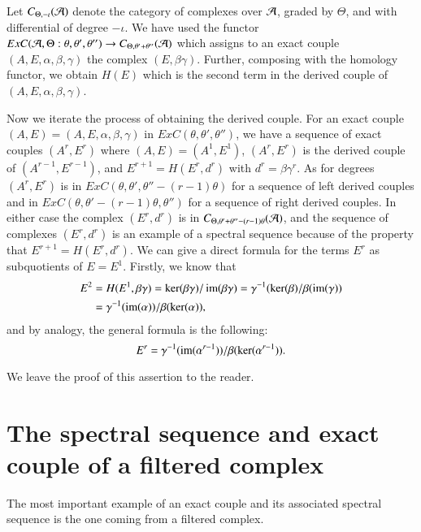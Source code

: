 \begin{remark}\label{chap1-rem4.3}
Let $C_{\Theta,-\iota}(\mathcal{A})$ denote the category of complexes over
$\mathcal{A}$, graded by $\Theta$, and with differential of degree $-\iota$. We
have used the functor $ExC(\mathcal{A},\Theta:\theta,\theta',\theta'')\to
C_{\Theta,\theta'+\theta''}(\mathcal{A})$ which assigns to an exact couple
$(A,E,\alpha,\beta,\gamma)$ the complex $(E,\beta\gamma)$. Further,
composing with the homology functor, we obtain $H(E)$ which is the
second term in the derived couple of $(A,E,\alpha,\beta,\gamma)$. 
\end{remark}

\begin{remark}\label{chap1-rem4.4}
Now we iterate the process of obtaining the derived couple. For an
exact couple $(A,E)=(A,E,\alpha,\beta,\gamma)$ in
$ExC(\theta,\theta',\theta'')$, we have a sequence of exact couples
$(A^{r},E^{r})$ where $(A,E)=(A^{1},E^{1})$, $(A^{r},E^{r})$ is the
derived couple of $(A^{r-1},E^{r-1})$, and $E^{r+1}=H(E^{r},d^{r})$
with $d^{r}=\beta\gamma^{r}$. As for degrees $(A^{r},E^{r})$ is in
$ExC(\theta,\theta',\theta''-(r-1)\theta)$ for a sequence of left
derived couples and in $ExC(\theta,\theta'-(r-1)\theta,\theta'')$ for
a sequence of right derived couples. In either case the complex
$(E^{r},d^{r})$ is in $C_{\Theta,\theta'+\theta''-(r-1)\theta}(\mathcal{A})$,
and the sequence of complexes $(E^{r},d^{r})$ is an example of a
spectral sequence because of the property that
$E^{r+1}=H(E^{r},d^{r})$. We can give a direct formula for the terms
$E^{r}$ as subquotients of $E=E^{1}$. Firstly, we know that
\begin{align*}
E^{2} &=
H(E^{1},\beta\gamma)=\ker(\beta\gamma)/\operatorname{im}(\beta\gamma)=\gamma^{-1}(\ker(\beta)/\beta(\operatorname{im}(\gamma))\\ 
&= \gamma^{-1}(\operatorname{im}(\alpha))/\beta(\ker(\alpha)), 
\end{align*}
and by analogy, the general formula is the following:
$$
E^{r}=\gamma^{-1}(\operatorname{im}(\alpha^{r-1}))/\beta(\ker(\alpha^{r-1})).
$$

We leave the proof of this assertion to the reader.
\end{remark}

\section[The spectral sequence and exact couple of...]{The spectral
  sequence and exact couple of a filtered 
  complex}\label{chap1-sec5} 

The most important example of an exact couple and its associated
spectral sequence is the one coming from a filtered complex.

